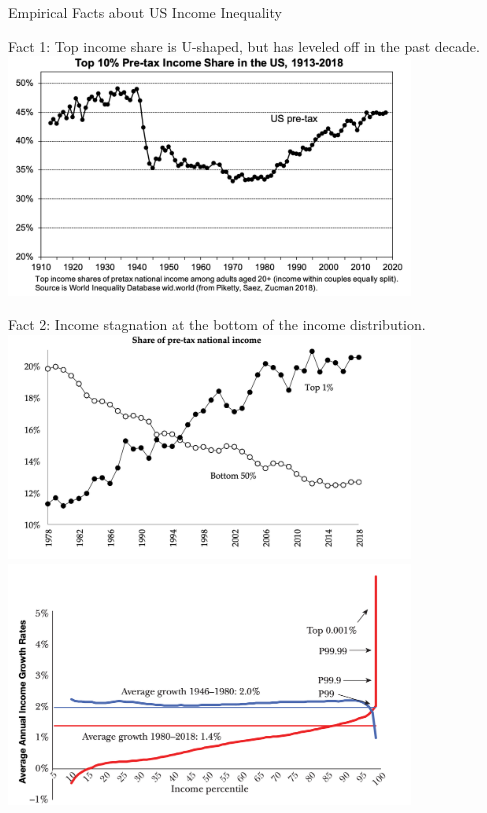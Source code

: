 \documentclass[8pt]{extarticle}
\begin{document}
  \begin{problem}{Empirical Facts about US Income Inequality}
    \begin{center}
      Fact 1: Top income share is U-shaped, but has leveled off in the past decade.\\
      \includegraphics[width=0.8\textwidth]{images/pretax_income.png}
    \end{center}
    \begin{center}
      Fact 2: Income stagnation at the bottom of the income distribution.\\
      \includegraphics[width=0.8\textwidth]{images/bottom_stagnation.png}\\
      \includegraphics[width=0.8\textwidth]{images/bottom_stagnation_2.png}

\end{center}
\end{problem}
\end{document}
